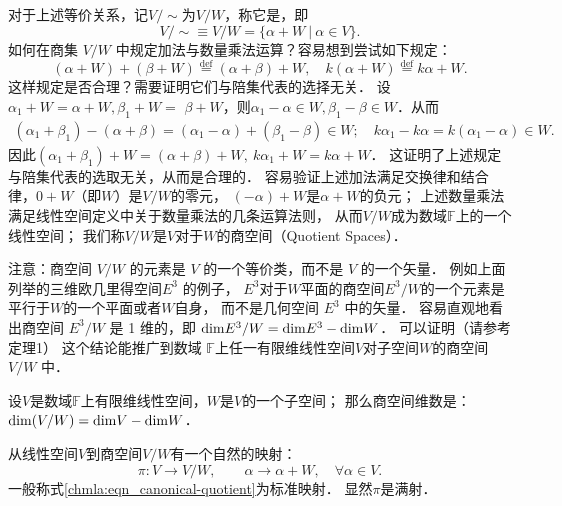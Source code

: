 对于上述等价关系，记$V / \sim$为$V / W$，称它是，即
\begin{equation}\label{chmla:eqn_Quotient}
    V / \sim \equiv V / W=\{\alpha+W \ |\ \alpha \in V \} .
\end{equation}
如何在商集 $V / W$ 中规定加法与数量乘法运算？容易想到尝试如下规定：
\begin{equation}\label{chmla:eqn_abwlin}
    (\alpha+W)+(\beta+W) \overset{\mathrm {def}}{=}(\alpha+\beta)+W, \quad
    k(\alpha+W) \overset{\mathrm {def}}{=} k \alpha+W .
\end{equation}
这样规定是否合理？需要证明它们与陪集代表的选择无关．
设$\alpha_1+W=\alpha+W, \beta_1+W=$ $\beta+W$，则$\alpha_1-\alpha \in W, \beta_1-\beta \in W$．从而
\begin{align*}
    (\alpha_1+\beta_1)-(\alpha+\beta)= (\alpha_1-\alpha)+(\beta_1-\beta) \in W; \quad
    k \alpha_1-k \alpha= k (\alpha_1-\alpha) \in W .
\end{align*}
因此$(\alpha_1+\beta_1)+W=(\alpha+\beta)+W,\ k \alpha_1+W=k \alpha+W$．
这证明了上述规定与陪集代表的选取无关，从而是合理的．
容易验证上述加法满足交换律和结合律，$0+W$（即$W$）是$V / W$的{\kaishu 零元}，
$(-\alpha)+W$是$\alpha+W$的{\kaishu 负元}；
上述数量乘法满足线性空间定义中关于数量乘法的几条运算法则，
从而$V / W$成为数域$\mathbb{F}$上的一个线性空间；
我们称$V / W$是$V$对于$W$的{\heiti 商空间}（Quotient Spaces）．

注意：商空间 $V / W$ 的元素是 $V$ 的一个等价类，而不是 $V$ 的一个矢量．
例如上面列举的三维欧几里得空间$E^3$ 的例子，
$E^3$对于$W$平面的商空间$E^3 / W$的一个元素是平行于$W$的一个平面或者$W$自身，
而不是几何空间 $E^3$ 中的矢量．
容易直观地看出商空间 $E^3 / W$ 是 1 维的，即 ${\rm dim}E^3 / W={\rm dim} E^3-{\rm dim} W$．
可以证明（请参考\parencite[p.219]{qiuws-2019-v2}定理1）
这个结论能推广到数域 $\mathbb{F}$上任一有限维线性空间$V$对子空间$W$的商空间$V / W$ 中．

\begin{theorem}\label{chmla:thm_dimvw}
    设$V$是数域$\mathbb{F}$上有限维线性空间，$W$是$V$的一个子空间；
    那么商空间维数是：$ {\rm dim} (V / W)={\rm dim} V-{\rm dim} W$．
\end{theorem}


从线性空间$V$到商空间$V/W$有一个自然的映射：
\begin{equation}\label{chmla:eqn_canonical-quotient}
    \pi: V \to V/W,\qquad  \alpha \to \alpha + W, \quad \forall\alpha\in V.
\end{equation}
一般称式\eqref{chmla:eqn_canonical-quotient}为{\heiti 标准映射}．
显然$\pi$是满射．





